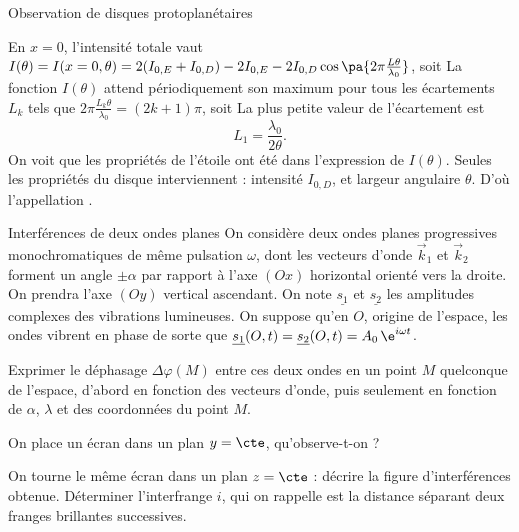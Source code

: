 \begin{exo}[PC][1][devoir]{Observation de disques protoplanétaires}
\begin{quest}
{  }{
  En $x=0$, l'intensité totale vaut $ I(\theta) = I(x=0,\theta) = 2(I_{0,E} +I_{0,D}) - 2I_{0,E} - 2I_{0,D} \cos\pa{2\pi \frac{L\theta}{\lambda_0} }$, soit
  La fonction $I(\theta)$ attend périodiquement son maximum  pour tous les écartements $L_k$ tels que $2\pi \frac{L_k\theta}{\lambda_0} = (2k+1)\pi$, soit
  La plus petite valeur de l'écartement est 
  $$
  L_1 = \frac{\lambda_0}{2\theta}.
  $$
  On voit que les propriétés de l'étoile ont été  dans l'expression de $I(\theta)$. Seules les propriétés du disque interviennent : intensité $I_{0,D}$, et largeur angulaire $\theta$. D'où l'appellation .
  }
\end{quest}

\end{exo}

\begin{exo}[PC][1][TD]{Interférences de deux ondes planes}
On considère deux ondes planes progressives monochromatiques de même pulsation $\omega$, dont les vecteurs d'onde $\vec{k}_1$ et $\vec{k}_2$ forment un angle $\pm\alpha$ par rapport à l'axe $(Ox)$ horizontal orienté vers la droite. On prendra l'axe $(Oy)$ vertical ascendant. On note $\underline{s_1}$ et $\underline{s_2}$ les amplitudes complexes des vibrations lumineuses. On suppose qu'en $O$, origine de l'espace, les ondes vibrent en phase de sorte que $\underline{s_1}(O,t)=\underline{s_2}(O,t)=A_{0}\,\e^{i\omega t}$.
\begin{quest}
\item Exprimer le déphasage $\Delta\varphi(M)$ entre ces deux ondes en un point $M$ quelconque de l'espace, d'abord en fonction des vecteurs d'onde, puis seulement en fonction de $\alpha$, $\lambda$ et des coordonnées du point $M$.
\item On place un écran dans un plan $y=\cte$, qu'observe-t-on ?
\item On tourne le même écran dans un plan $z=\cte$ : décrire la figure d'interférences obtenue. Déterminer l'interfrange $i$, qui on rappelle est la distance séparant deux franges brillantes successives.
\end{quest}
\end{exo}

